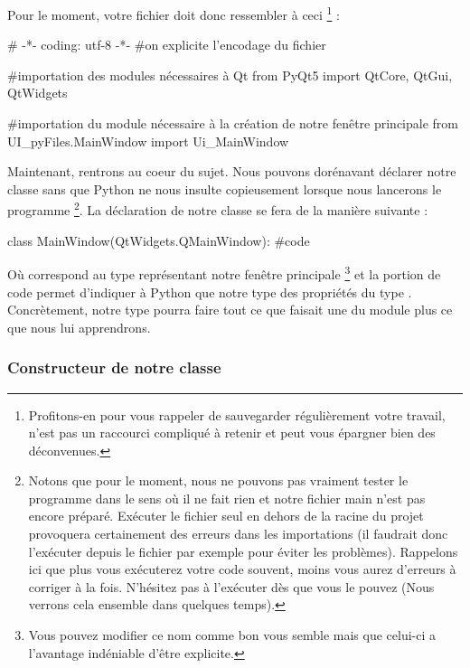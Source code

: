 \documentclass[12pt]{report}    %
\begin{document}
Pour le moment, votre fichier doit donc ressembler à ceci
\footnote
{
Profitons-en pour vous rappeler de sauvegarder régulièrement votre travail, \textcolor{red}{} n'est pas un raccourci compliqué à retenir et peut vous épargner bien des déconvenues.
}
:
\begin{pyCode}
# -*- coding: utf-8 -*-
#on explicite l’encodage du fichier

#importation des modules nécessaires à Qt
from PyQt5 import QtCore, QtGui, QtWidgets

#importation du module nécessaire à la création de notre fenêtre principale
from UI_pyFiles.MainWindow import Ui_MainWindow
\end{pyCode}
\smallSkip %

Maintenant, rentrons au coeur du sujet. Nous pouvons dorénavant déclarer notre classe sans que Python ne nous insulte copieusement lorsque nous lancerons le programme
\footnote
{
Notons que pour le moment, nous ne pouvons pas vraiment tester le programme dans le sens où il ne fait rien et notre fichier main n'est pas encore préparé. Exécuter le fichier seul en dehors de la racine du projet provoquera certainement des erreurs dans les importations (il faudrait donc l'exécuter depuis le fichier  par exemple pour éviter les problèmes).\newline
Rappelons ici que plus vous exécuterez votre code souvent, moins vous aurez d'erreurs à corriger à la fois. N'hésitez pas à l'exécuter dès que vous le pouvez (Nous verrons cela ensemble dans quelques temps).
}.\newline
La déclaration de notre classe se fera de la manière suivante :
\begin{pyCode}
class MainWindow(QtWidgets.QMainWindow):
    #code
\end{pyCode}
Où  correspond au type représentant notre fenêtre principale
\footnote
{
Vous pouvez modifier ce nom comme bon vous semble mais que celui-ci a l'avantage indéniable d'être explicite.
}
et la portion de code  permet d'indiquer à Python que notre type   des propriétés du type .\newline
Concrètement, notre type pourra faire tout ce que faisait une  du module  plus ce que nous lui apprendrons.


\subsubsection{Constructeur de notre classe}
\end{document}
